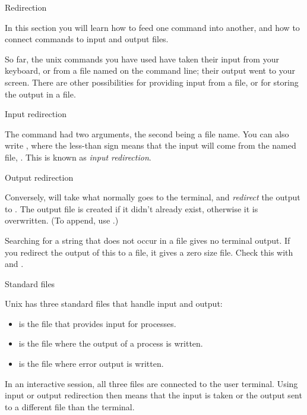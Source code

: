  {Redirection}
\label{sec:unixpipe}

\begin{purpose}
  In this section you will learn how to feed one command into another,
  and how to connect commands to input and output files.
\end{purpose}

So far, the unix commands you have used have taken their input from
your keyboard, or from a file named on the command line; their output
went to your screen. There are other possibilities for providing input
from a file, or for storing the output in a file.

 {Input redirection}

The  command had two arguments, the second being a file
name. You can also write , where the
less-than sign means that the input will come from the named file,
. This is known as \emph{input redirection}.

 {Output redirection}

Conversely,  will take what
normally goes to the terminal, and \emph{redirect}
the output to . The output
file is created if it didn't already exist, otherwise it is
overwritten. (To append, use .)

{Searching for a
  string that does not occur in a file gives no terminal output. If
  you redirect the output of this  to a file, it gives a zero size
  file. Check this with  and .}{}


 {Standard files}

Unix has three standard files that handle input and output:
\begin{itemize}
\item [{\tt stdin}\ ] is the file that provides input for processes.
\item [{\tt stdout}] is the file where the output of a process is
  written.
\item [{\tt stderr}] is the file where error output is written.
\end{itemize}
In an interactive session, all three files are connected to the user
terminal. Using input or output redirection then means that the input
is taken or the output sent to a different file than the terminal.

